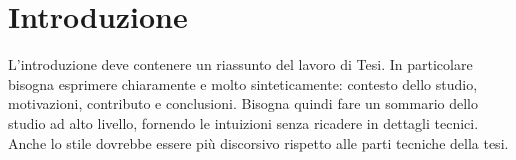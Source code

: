 \chapter*{Introduzione} %
L'introduzione deve contenere un riassunto del lavoro di Tesi.
In particolare bisogna esprimere chiaramente e molto sinteticamente: contesto dello studio, motivazioni, contributo e conclusioni.
Bisogna quindi fare un sommario dello studio ad alto livello, fornendo le intuizioni senza ricadere in dettagli tecnici.
Anche lo stile dovrebbe essere più discorsivo rispetto alle parti tecniche della tesi.

